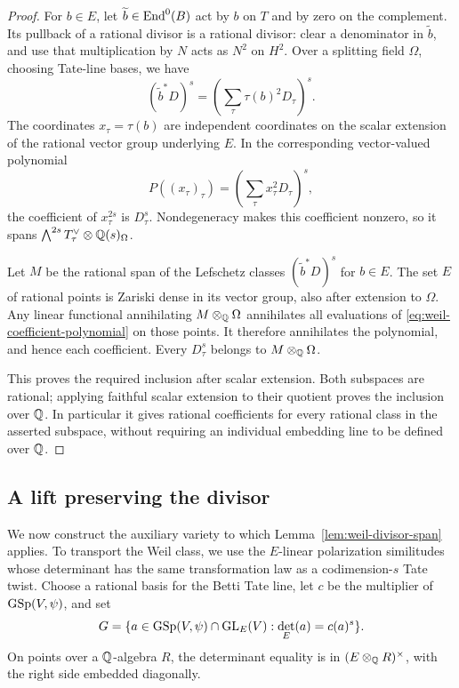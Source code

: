 \begin{proof}
For $b\in E$, let $\widetilde b\in\operatorname{End}^0(B)$ act by $b$ on $T$ and
by zero on the complement.  Its pullback of a rational divisor is a
rational divisor: clear a denominator in $\widetilde b$, and use
that multiplication by $N$ acts as $N^2$ on $H^2$.  Over a splitting
field $\Omega$, choosing Tate-line bases, we have
\[
 (\widetilde b^*D)^s
       =\left(\sum_\tau\tau(b)^2D_\tau\right)^s.
\]
The coordinates $x_\tau=\tau(b)$ are independent coordinates on the
scalar extension of the rational vector group underlying $E$.
In the corresponding vector-valued polynomial
\begin{equation}\label{eq:weil-coefficient-polynomial}
 P((x_\tau)_\tau)=\left(\sum_\tau x_\tau^2D_\tau\right)^s,
\end{equation}
the coefficient of $x_\tau^{2s}$ is $D_\tau^s$.  Nondegeneracy makes
this coefficient nonzero, so it spans
$\bigwedge^{2s}T_\tau^\vee\otimes\mathbb Q(s)_\Omega$.

Let $M$ be the rational span of the Lefschetz classes
$(\widetilde b^*D)^s$ for $b\in E$.  The set $E$ of rational points
is Zariski dense in its vector group, also after extension to
$\Omega$.  Any linear functional annihilating $M\otimes_\mathbb Q\Omega$
annihilates all evaluations of \eqref{eq:weil-coefficient-polynomial}
on those points.  It therefore annihilates the polynomial, and hence
each coefficient.  Every $D_\tau^s$ belongs to
$M\otimes_\mathbb Q\Omega$.

This proves the required inclusion after scalar extension.  Both
subspaces are rational; applying faithful scalar extension to their
quotient proves the inclusion over $\mathbb Q$.  In particular it gives
rational coefficients for every rational class in the asserted
subspace, without requiring an individual embedding line to be
defined over $\mathbb Q$.
\end{proof}

\subsection{A lift preserving the divisor}

We now construct the auxiliary variety to which
Lemma~\ref{lem:weil-divisor-span} applies.  To transport the Weil class,
we use the $E$-linear polarization similitudes whose determinant has
the same transformation law as a codimension-$s$ Tate twist.
Choose a rational basis
for the Betti Tate line, let $c$ be the multiplier of
$\operatorname{GSp}(V,\psi)$, and set
\begin{equation}\label{eq:weil-group}
 G=\{a\in\operatorname{GSp}(V,\psi)\cap\operatorname{GL}_E(V):
                         \det_E(a)=c(a)^s\}.
\end{equation}
On points over a $\mathbb Q$-algebra $R$, the determinant equality is in
$(E\otimes_\mathbb Q R)^\times$, with the right side embedded diagonally.

